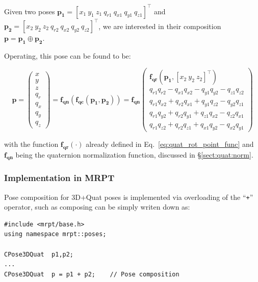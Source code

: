 \documentclass[a4paper,10pt]{report}
\begin{document}
Given two poses 
$\mathbf{p_1} = [x_1 ~ y_1 ~ z_1 ~  q_{r1} ~ q_{x1} ~ q_{y1} ~ q_{z1} ] ^ \top$
and 
$\mathbf{p_2} = [x_2 ~ y_2 ~ z_2 ~  q_{r2} ~ q_{x2} ~ q_{y2} ~ q_{z2} ] ^ \top$, 
we are interested in their composition $\mathbf{p}=\mathbf{p_1} \oplus \mathbf{p_2}$.

Operating, this pose can be found to be:

\begin{equation}
\mathbf{p} = 
\left(\begin{array}{c}
 x \\ y \\ z \\ q_r \\ q_x \\ q_y \\ q_z      
\end{array}\right)
= \mathbf{f_{qn}}\left(  \mathbf{f_{qc}}(\mathbf{p_1},\mathbf{p_2}) \right)
=
\mathbf{f_{qn}}
\left(\begin{array}{c}
  \mathbf{f_{qr}} (\mathbf{p_1}, [ x_2 ~ y_2 ~ z_2]^\top ) \\
q_{r1} q_{r2} - q_{x1} q_{x2} - q_{y1} q_{y2} - q_{z1} q_{z2} \\
q_{r1} q_{x2} + q_{r2} q_{x1} + q_{y1} q_{z2} - q_{y2} q_{z1} \\
q_{r1} q_{y2} + q_{r2} q_{y1} + q_{z1} q_{x2} - q_{z2} q_{x1} \\
q_{r1} q_{z2} + q_{r2} q_{z1} + q_{x1} q_{y2} - q_{x2} q_{y1}
\end{array}\right)
\end{equation}

\noindent with the function $\mathbf{f_{qr}}(\cdot)$ already defined in Eq.~\ref{eq:quat_rot_point_func}
and $\mathbf{f_{qn}}$ being the quaternion normalization function, discussed in 
\S \ref{sect:quat:norm}.


\subsubsection{Implementation in MRPT}

Pose composition for 3D+Quat poses is implemented via overloading 
of the ``\texttt{+}'' operator, such as composing can be simply 
writen down as:

\begin{lstlisting}
#include <mrpt/base.h> 
using namespace mrpt::poses; 

CPose3DQuat  p1,p2; 
...
CPose3DQuat  p = p1 + p2;    // Pose composition
\end{lstlisting}
\end{document}
